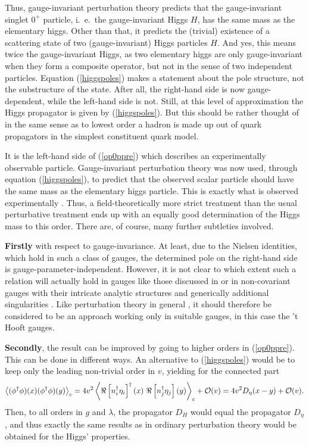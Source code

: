 \documentclass[final,12pt]{article}
\newcommand*{\no}{\noindent}
\newcommand*{\be}{\begin{equation}}
\newcommand*{\ee}{\end{equation}}
\newcommand*{\pref}[1]{(\ref{#1})}
\newcommand*{\nn}{\nonumber}
\newcommand*{\1}{1\!\!\!\bot}
\newcommand*{\la}{\left\langle}
\newcommand*{\ra}{\right\rangle}
\newcommand*{\op}{{\cal O}}
\begin{document}
Thus, gauge-invariant perturbation theory predicts that the gauge-invariant singlet $0^+$ particle, i.\ e.\ the gauge-invariant Higgs $H$, has the same mass as the elementary higgs. Other than that, it predicts the (trivial) existence of a scattering state of two (gauge-invariant) Higgs particles $H$. And yes, this means twice the gauge-invariant Higgs, as two elementary higgs are only gauge-invariant when they form a composite operator, but not in the sense of two independent particles. Equation \pref{higgspoles} makes a statement about the pole structure, not the substructure of the state. After all, the right-hand side is now gauge-dependent, while the left-hand side is not. Still, at this level of approximation the Higgs propagator is given by \pref{higgspoles}. But this should be rather thought of in the same sense as to lowest order a hadron is made up out of quark propagators in the simplest constituent quark model.

It is the left-hand side of \pref{op0ppre} which describes an experimentally observable particle. Gauge-invariant perturbation theory was now used, through equation \pref{higgspoles}, to predict that the observed scalar particle should have the same mass as the elementary higgs particle. This is exactly what is observed experimentally \cite{pdg}. Thus, a field-theoretically more strict treatment than the usual perturbative treatment \cite{Bohm:2001yx} ends up with an equally good determination of the Higgs mass to this order. There are, of course, many further subtleties involved.

{\bf Firstly} with respect to gauge-invariance. At least, due to the Nielsen identities, which hold in such a class of gauges, the determined pole on the right-hand side is gauge-parameter-independent. However, it is not clear to which extent such a relation will actually hold in gauges like those discussed in \cite{Dolan:1974gu} or in non-covariant gauges with their intricate analytic structures and generically additional singularities \cite{Burnel:2008zz}. Like perturbation theory in general \cite{Lee:1974zg}, it should therefore be considered to be an approach working only in suitable gauges, in this case the 't Hooft gauges.

{\bf Secondly}, the result can be improved by going to higher orders in \pref{op0ppre}. This can be done in different ways. An alternative to \pref{higgspoles} would be to keep only the leading non-trivial order in $v$, yielding for the connected part
\be
\la(\phi^\dagger\phi)(x)(\phi^\dagger\phi)(y)\ra_c = 4v^2\la \Re\left[n_i^\dagger\eta_i\right]^\dagger(x)~\Re\left[n_j^\dagger\eta_j\right](y) \ra_c+\op(v)=4v^2D_\eta(x-y)+\op(v)\nn.
\ee
\no Then, to all orders in $g$ and $\lambda$, the propagator $D_H$ would equal the propagator $D_\eta$, and thus exactly the same results as in ordinary perturbation theory would be obtained for the Higgs' properties.
\end{document}
